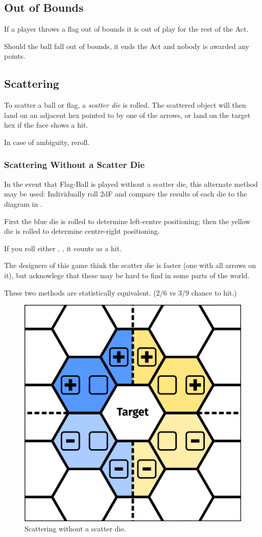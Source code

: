 \subsection{Out of Bounds}
If a player throws a flag out of bounds it is out of play for the rest of the Act.

Should the ball fall out of bounds, it ends the Act and nobody is awarded any points.

\subsection{Scattering}\label{scattering}
To scatter a ball or flag, a \textit{scatter die} is rolled.
The scattered object will then land on an adjacent hex pointed to by one of the arrows, or land on the target hex if the face shows a hit.

In case of ambiguity, reroll.

\subsubsection{Scattering Without a Scatter Die}
In the event that Flag-Ball is played without a scatter die, this alternate method may be used:
Individually roll 2dF and compare the results of each die to the diagram in .

First the blue die is rolled to determine left-centre positioning; then the yellow die is rolled to determine centre-right positioning.

If you roll either \plus{}\minus{}, \minus{}\plus{}, \blank{}\blank{} it counts as a hit.

\begin{note}
The designers of this game think the scatter die is faster (one with all arrows on it), but acknowlege that these may be hard to find in some parts of the world.

These two methods are statistically equivalent. ($2/6$ vs $3/9$ chance to hit.)
\end{note}

\begin{figure}
    \centering
    \includegraphics{graphics/scatter.png}
    \caption{Scattering without a scatter die.}
    \label{fig:scatter-alternative}
\end{figure}